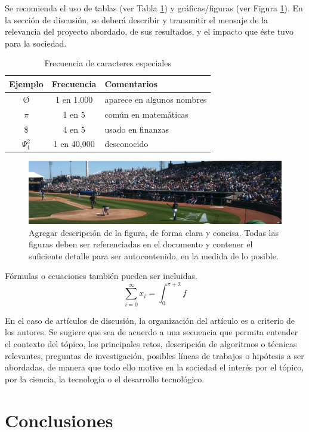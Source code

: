 \documentclass[sigconf]{acmart}
\begin{document}
Se recomienda el uso de tablas (ver Tabla \ref{tab:freq}) y gráficas/figuras (ver Figura \ref{figEjemplo}). 
En la sección de discusión, se deberá describir y transmitir el mensaje de la relevancia del proyecto abordado, de sus resultados, y el impacto que éste tuvo para la sociedad.

\begin{table}
  \caption{Frecuencia de caracteres especiales}
  \label{tab:freq}
  \begin{tabular}{ccl}
    \toprule
    Ejemplo&Frecuencia&Comentarios\\
    \midrule
    \O & 1 en 1,000& aparece en algunos nombres\\
    $\pi$ & 1 en 5& común en matemáticas\\
    \$ & 4 en 5 & usado en finanzas\\
    $\Psi^2_1$ & 1 en 40,000& desconocido\\
  \bottomrule
\end{tabular}
\end{table}

\begin{figure}
  \includegraphics[width=.45\textwidth]{sample}
  \caption{Agregar descripción de la figura, de forma clara y concisa. Todas las figuras deben ser referenciadas en el documento y contener el suficiente detalle para ser autocontenido, en la medida de lo posible.}
  \label{figEjemplo}
\end{figure}

Fórmulas o ecuaciones también pueden ser incluidas.
\begin{equation}
  \sum_{i=0}^{\infty}x_i=\int_{0}^{\pi+2} f
\end{equation}

En el caso de artículos de discusión, la organización del artículo es a criterio de los autores. Se sugiere que sea de acuerdo a una secuencia que permita entender el contexto del tópico, los principales retos, descripción de algoritmos o técnicas relevantes, preguntas de investigación, posibles líneas de trabajos o hipótesis a ser abordadas, de manera que todo ello motive en la sociedad el interés por el tópico, por la ciencia, la tecnología o el desarrollo tecnológico.


\section{Conclusiones}
\end{document}
